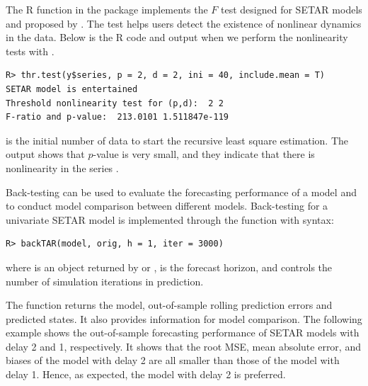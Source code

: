\medskip
The R function  in the  package implements the $F$ test designed for SETAR models and proposed by \cite{tsay1989}. The test helps users detect the existence of nonlinear dynamics in the data. Below is the {R} code and output when we perform the nonlinearity tests with .
\begin{verbatim}
R> thr.test(y$series, p = 2, d = 2, ini = 40, include.mean = T)
SETAR model is entertained 
Threshold nonlinearity test for (p,d):  2 2 
F-ratio and p-value:  213.0101 1.511847e-119 
\end{verbatim}
 is the initial number of data to start the recursive least square estimation. The output shows that $p$-value is very small, and they indicate that there is nonlinearity in the series .



\medskip
Back-testing can be used to evaluate the forecasting performance of a model and to
 conduct model comparison between different models. Back-testing for a univariate SETAR model is implemented through the function  with syntax:
\begin{verbatim}
R> backTAR(model, orig, h = 1, iter = 3000)
\end{verbatim}
where  is an object returned by  or ,  is the forecast horizon, and  controls the number of simulation iterations in prediction.

The function returns the model, out-of-sample rolling prediction errors and predicted states. It also
provides information  for model comparison. The following example shows the out-of-sample forecasting performance of SETAR models with delay 2 and 1, respectively. It shows that the root MSE,  mean absolute error, and biases of the model with delay 2 are all smaller than those of the model with delay 1. Hence, as expected, the model with delay 2 is preferred.

